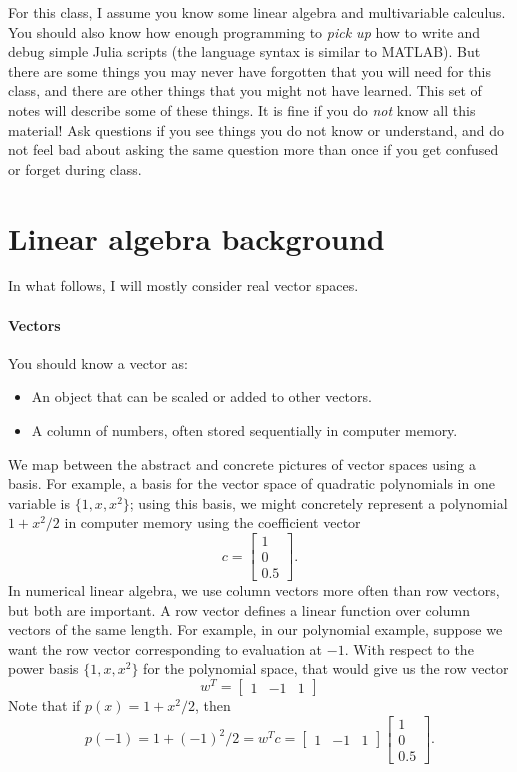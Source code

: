 \documentclass[12pt, leqno]{article}
\begin{document}
\lstset{language=matlab,columns=flexible}

For this class, I assume you know some linear algebra and
multivariable calculus.  You should also know how enough programming
to {\em pick up} how to write and debug simple Julia scripts (the
language syntax is similar to MATLAB).
But there are some things you may never have forgotten that you
will need for this class, and there are other things that you might
not have learned.  This set of notes will describe some of these things.
It is fine if you do {\em not} know all this material!  Ask questions
if you see things you do not know or understand, and do not feel bad
about asking the same question more than once if you get confused or
forget during class.

\section{Linear algebra background}

In what follows, I will mostly consider real vector spaces.

\paragraph{Vectors}
You should know a vector as:
\begin{itemize}
\item An object that can be scaled or added to other vectors.
\item A column of numbers, often stored sequentially
  in computer memory.
\end{itemize}
We map between the abstract and concrete pictures of vector spaces
using a basis.  For example, a basis for the vector space of quadratic
polynomials in one variable is $\{1, x, x^2\}$; using this basis, we
might concretely represent a polynomial $1 + x^2/2$ in computer memory
using the coefficient vector
\[
  c = \begin{bmatrix} 1 \\ 0 \\ 0.5 \end{bmatrix}.
\]
In numerical linear algebra, we use column vectors more often than
row vectors, but both are important.  A row vector defines a linear
function over column vectors of the same length.  For example,
in our polynomial example, suppose we want the row vector
corresponding to evaluation at $-1$.  With respect to the power basis
$\{1, x, x^2\}$ for the polynomial space, that would give us the
row vector
\[
  w^T = \begin{bmatrix} 1 & -1 & 1 \end{bmatrix}
\]
Note that if $p(x) = 1+x^2/2$, then
\[
  p(-1) = 1 + (-1)^2/2
  = w^T c
  = \begin{bmatrix} 1 & -1 & 1 \end{bmatrix}
    \begin{bmatrix} 1 \\ 0 \\ 0.5 \end{bmatrix}.
\]
\end{document}
